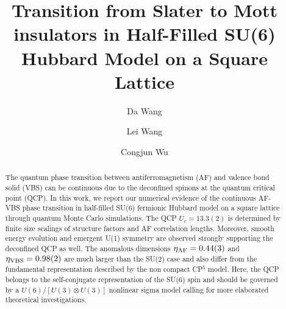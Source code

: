 \documentclass[twocolumn,superscriptaddress]{revtex4-1}
\begin{document}
\title{Transition from Slater to Mott insulators in Half-Filled SU(6) Hubbard Model on a Square Lattice}
\author{Da Wang} %
\author{Lei Wang} %
\author{Congjun Wu} %
\begin{abstract}
  The quantum phase transition between antiferromagnetism (AF) and valence bond solid (VBS) can be continuous due to the deconfined spinons at the quantum critical point (QCP). In this work, we report our numerical evidence of the continuous AF-VBS phase transition in half-filled SU(6) fermionic Hubbard model on a square lattice through quantum Monte Carlo simulations. The QCP $U_c=13.3(2)$ is determined by finite size scalings of structure factors and AF correlation lengths. Moreover, smooth energy evolution and emergent U(1) symmetry are observed strongly supporting the deconfined QCP as well. The anomalous dimensions $\eta_{\rm AF}=0.44(3)$ and $\eta_{\rm VBS}=0.98(2)$ are much larger than the SU(2) case and also differ from the fundamental representation described by the non compact CP$^{5}$ model. Here, the QCP belongs to the self-conjugate representation of the SU(6) spin and should be governed by a $U(6)/[U(3)\otimes U(3)]$ nonlinear sigma model calling for more elaborated theoretical investigations. 
\end{abstract}
\maketitle
\end{document}
